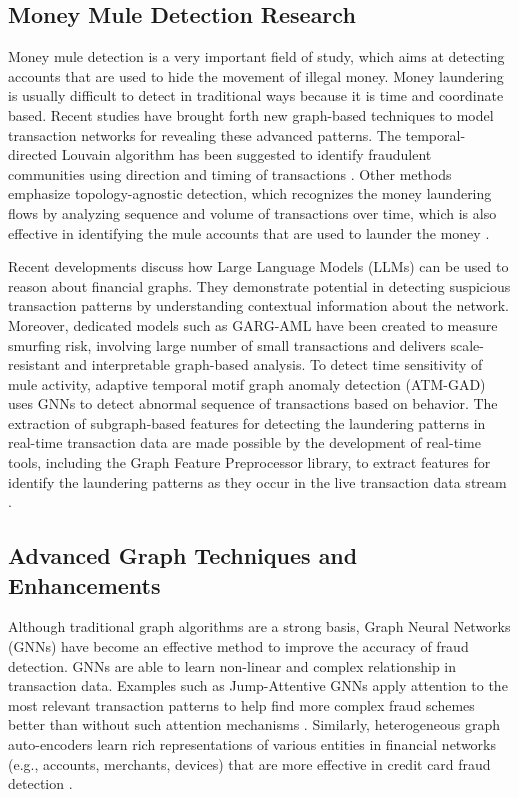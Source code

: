 \documentclass[lettersize,journal]{IEEEtran}
\begin{document}
\subsection{Money Mule Detection Research}
Money mule detection is a very important field of study, which aims at detecting accounts that are used to hide the movement of illegal money. Money laundering is usually difficult to detect in traditional ways because it is time and coordinate based. Recent studies have brought forth new graph-based techniques to model transaction networks for revealing these advanced patterns. The temporal-directed Louvain algorithm has been suggested to identify fraudulent communities using direction and timing of transactions \cite{b11}. Other methods emphasize topology-agnostic detection, which recognizes the money laundering flows by analyzing sequence and volume of transactions over time, which is also effective in identifying the mule accounts that are used to launder the money \cite{b12}.

Recent developments discuss how Large Language Models (LLMs) can be used to reason about financial graphs. They demonstrate potential in detecting suspicious transaction patterns by understanding contextual information about the network. Moreover, dedicated models such as GARG-AML have been created to measure smurfing risk, involving large number of small transactions and delivers scale-resistant and interpretable graph-based analysis. To detect time sensitivity of mule activity, adaptive temporal motif graph anomaly detection (ATM-GAD) uses GNNs to detect abnormal sequence of transactions based on behavior. The extraction of subgraph-based features for detecting the laundering patterns in real-time transaction data are made possible by the development of real-time tools, including the Graph Feature Preprocessor library, to extract features for identify the laundering patterns as they occur in the live transaction data stream \cite{b16}.

\subsection{Advanced Graph Techniques and Enhancements}
Although traditional graph algorithms are a strong basis, Graph Neural Networks (GNNs) have become an effective method to improve the accuracy of fraud detection. GNNs are able to learn non-linear and complex relationship in transaction data. Examples such as Jump-Attentive GNNs apply attention to the most relevant transaction patterns to help find more complex fraud schemes better than without such attention mechanisms \cite{b17}. Similarly, heterogeneous graph auto-encoders learn rich representations of various entities in financial networks (e.g., accounts, merchants, devices) that are more effective in credit card fraud detection \cite{b18}.
\end{document}
